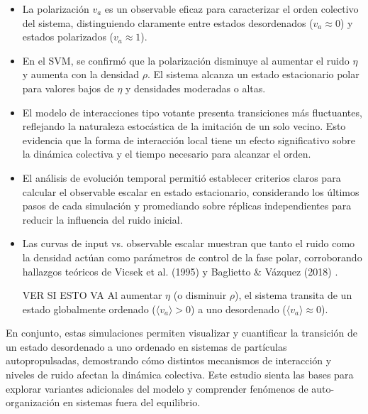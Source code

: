 \documentclass{article}
\begin{document}
\begin{itemize}
    \item La polarización \(v_a\) es un observable eficaz para caracterizar el orden colectivo del sistema, distinguiendo claramente entre estados desordenados (\(v_a \approx 0\)) y estados polarizados (\(v_a \approx 1\)).
    \item En el SVM, se confirmó que la polarización disminuye al aumentar el ruido \(\eta\) y aumenta con la densidad \(\rho\). El sistema alcanza un estado estacionario polar para valores bajos de \(\eta\) y densidades moderadas o altas.
    \item El modelo de interacciones tipo votante presenta transiciones más fluctuantes, reflejando la naturaleza estocástica de la imitación de un solo vecino. Esto evidencia que la forma de interacción local tiene un efecto significativo sobre la dinámica colectiva y el tiempo necesario para alcanzar el orden.
    \item El análisis de evolución temporal permitió establecer criterios claros para calcular el observable escalar en estado estacionario, considerando los últimos pasos de cada simulación y promediando sobre réplicas independientes para reducir la influencia del ruido inicial.
    \item Las curvas de input vs. observable escalar muestran que tanto el ruido como la densidad actúan como parámetros de control de la fase polar, corroborando hallazgos teóricos de Vicsek et al. (1995) y Baglietto \& Vázquez (2018) \cite{baglietto2018}.

VER SI ESTO VA
    Al aumentar \(\eta\) (o disminuir \(\rho\)), el sistema transita de un estado globalmente ordenado (\(\langle v_a\rangle>0\)) a uno desordenado (\(\langle v_a\rangle\approx 0\)).
\end{itemize}

En conjunto, estas simulaciones permiten visualizar y cuantificar la transición de un estado desordenado a uno ordenado en sistemas de partículas autopropulsadas, demostrando cómo distintos mecanismos de interacción y niveles de ruido afectan la dinámica colectiva. Este estudio sienta las bases para explorar variantes adicionales del modelo y comprender fenómenos de auto-organización en sistemas fuera del equilibrio.

\printbibliography[title={Referencias}]
\end{document}
